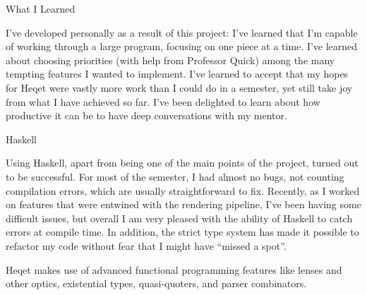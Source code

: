 \documentclass{article}
\begin{document}
\begin{section}{What I Learned}

I've developed personally as a result of this project: I've learned that I'm capable of working through a large program, focusing on one piece at a time. I've learned about choosing priorities (with help from Professor Quick) among the many tempting features I wanted to implement. I've learned to accept that my hopes for Heqet were vastly more work than I could do in a semester, yet still take joy from what I have achieved so far. I've been delighted to learn about how productive it can be to have deep conversations with my mentor.

\end{section}
\begin{section}{Haskell}

Using Haskell, apart from being one of the main points of the project, turned out to be successful. For most of the semester, I had almost no bugs, not counting compilation errors, which are usually straightforward to fix. Recently, as I worked on features that were entwined with the rendering pipeline, I've been having some difficult issues, but overall I am very pleased with the ability of Haskell to catch errors at compile time. In addition, the strict type system has made it possible to refactor my code without fear that I might have ``missed a spot''. 

Heqet makes use of advanced functional programming features like lenses and other optics, existential types, quasi-quoters, and parser combinators.

\end{section}
\end{document}
